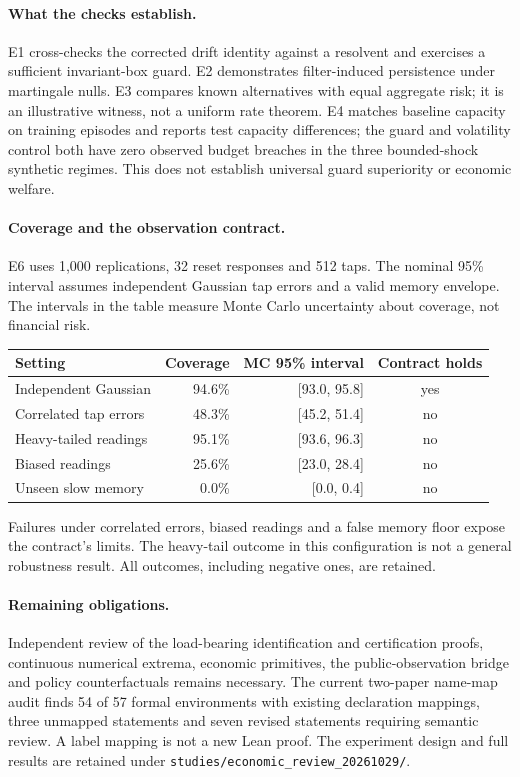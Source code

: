 \documentclass[12pt]{article}
\theoremstyle{definition}
\theoremstyle{remark}
\begin{document}
\paragraph{What the checks establish.} E1 cross-checks the corrected drift identity
against a resolvent and exercises a sufficient invariant-box guard. E2 demonstrates
filter-induced persistence under martingale nulls. E3 compares known alternatives
with equal aggregate risk; it is an illustrative witness, not a uniform rate
theorem. E4 matches baseline capacity on training episodes and reports test
capacity differences; the guard and volatility control both have zero observed
budget breaches in the three bounded-shock synthetic regimes. This does not
establish universal guard superiority or economic welfare.

\paragraph{Coverage and the observation contract.} E6 uses 1,000 replications,
32 reset responses and 512 taps. The nominal 95\% interval assumes independent
Gaussian tap errors and a valid memory envelope. The intervals in the table
measure Monte Carlo uncertainty about coverage, not financial risk.
\begin{center}\small
\begin{tabular}{lrrc}
\toprule
Setting & Coverage & MC 95\% interval & Contract holds\\
\midrule
Independent Gaussian & 94.6\% & [93.0, 95.8] & yes\\
Correlated tap errors & 48.3\% & [45.2, 51.4] & no\\
Heavy-tailed readings & 95.1\% & [93.6, 96.3] & no\\
Biased readings & 25.6\% & [23.0, 28.4] & no\\
Unseen slow memory & 0.0\% & [0.0, 0.4] & no\\
\bottomrule
\end{tabular}
\end{center}
Failures under correlated errors, biased readings and a false memory floor expose
the contract's limits. The heavy-tail outcome in this configuration is not a
general robustness result. All outcomes, including negative ones, are retained.

\paragraph{Remaining obligations.} Independent review of the load-bearing
identification and certification proofs, continuous numerical extrema, economic
primitives, the public-observation bridge and policy counterfactuals remains
necessary. The current two-paper name-map audit finds 54 of 57 formal environments
with existing declaration mappings, three unmapped statements and seven revised
statements requiring semantic review. A label mapping is not a new Lean proof.
The experiment design and full results are retained under
\texttt{studies/economic\_review\_20261029/}.
\end{document}
